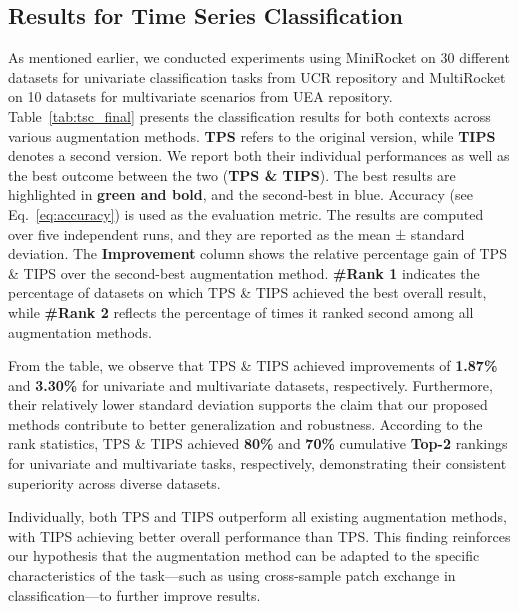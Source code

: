 \subsection{Results for Time Series Classification} \label{subsec:main_results-tsc}



As mentioned earlier, we conducted experiments using MiniRocket on 30 different datasets for univariate classification tasks from UCR repository and MultiRocket on 10 datasets for multivariate scenarios from UEA repository. Table~\ref{tab:tsc_final} presents the classification results for both contexts across various augmentation methods. \textbf{TPS} refers to the original version, while \textbf{TIPS} denotes a second version. We report both their individual performances as well as the best outcome between the two (\textbf{TPS \& TIPS}). The best results are highlighted in \textbf{green and bold}, and the second-best in blue.
Accuracy (see Eq.~\ref{eq:accuracy}) is used as the evaluation metric. The results are computed over five independent runs, and they are reported as the mean ± standard deviation. The \textbf{Improvement} column shows the relative percentage gain of TPS \& TIPS over the second-best augmentation method. \textbf{\#Rank 1} indicates the percentage of datasets on which TPS \& TIPS achieved the best overall result, while \textbf{\#Rank 2} reflects the percentage of times it ranked second among all augmentation methods.

From the table, we observe that TPS \& TIPS achieved improvements of \textbf{1.87\%} and \textbf{3.30\%} for univariate and multivariate datasets, respectively. Furthermore, their relatively lower standard deviation supports the claim that our proposed methods contribute to better generalization and robustness. According to the rank statistics, TPS \& TIPS achieved \textbf{80\%} and \textbf{70\%} cumulative \textbf{Top-2} rankings for univariate and multivariate tasks, respectively, demonstrating their consistent superiority across diverse datasets. 

Individually, both TPS and TIPS outperform all existing augmentation methods, with TIPS achieving better overall performance than TPS. This finding reinforces our hypothesis that the augmentation method can be adapted to the specific characteristics of the task—such as using cross-sample patch exchange in classification—to further improve results.




